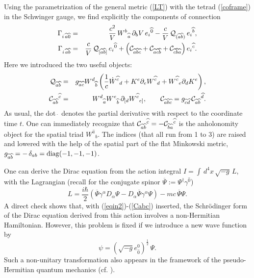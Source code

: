 \documentclass[preprint,showpacs,preprintnumbers,eqsecnum,amsmath,amssymb]{revtex4-1}
\begin{document}
Using the parametrization of the general metric (\ref{LT}) with the tetrad
(\ref{coframe}) in the Schwinger gauge, we find explicitly the components of connection
\begin{eqnarray}
\Gamma_{i\,\widehat{a}\widehat{0}} &=& {\frac {c^2}V}\,W^b{}_{\widehat{a}}
\,\partial_bV\,e_i{}^{\widehat{0}} - {\frac cV}\,{\cal Q}_{(\widehat{a}
\widehat{b})}\,e_i{}^{\widehat{b}},\label{connection1}\\
\Gamma_{i\,\widehat{a}\widehat{b}} &=& {\frac cV}\,{\cal Q}_{[\widehat{a}
\widehat{b}]}\,e_i{}^{\widehat{0}} + \left({\cal C}_{\widehat{a}\widehat{b}
\widehat{c}} + {\cal C}_{\widehat{a}\widehat{c}\widehat{b}} + {\cal C}_{\widehat{c}
\widehat{b}\widehat{a}}\right) e_i{}^{\widehat{c}}.\label{connection2}
\end{eqnarray}
Here we introduced the two useful objects:
\begin{eqnarray}
{\cal Q}_{\widehat{a}\widehat{b}} &=& g_{\widehat{a}\widehat{c}}W^d{}_{\widehat{b}}
\left({\frac 1c}\dot{W}^{\widehat c}{}_d + K^e\partial_e{W}^{\widehat c}{}_d
+ {W}^{\widehat c}{}_e\partial_dK^e\right),\label{Qab}\\
{\cal C}_{\widehat{a}\widehat{b}}{}^{\widehat{c}} &=& W^d{}_{\widehat{a}}
W^e{}_{\widehat{b}}\,\partial_{[d}W^{\widehat{c}}{}_{e]},\qquad {\cal
C}_{\widehat{a} \widehat{b}\widehat{c}} = g_{\widehat{c}\widehat{d}}
\,{\cal C}_{\widehat{a}\widehat{b}}{}^{\widehat{d}}.\label{Cabc}
\end{eqnarray}
As usual, the dot $\dot{\,}$ denotes the partial derivative with respect
to the coordinate time $t$. One can immediately recognize that ${\cal
C}_{\widehat{a}\widehat{b}}{}^{\widehat{c}} =- {\cal C}_{\widehat{b}\widehat{a}}{}^{\widehat{c}}$
is the anholonomity object for the spatial triad ${W}^{\widehat a}{}_b$.
The indices (that all run from 1 to 3) are raised and lowered with
the help of the spatial part of the flat Minkowski metric,
$g_{\widehat{a}\widehat{b}} = -\,\delta_{ab} = {\rm diag}(-1, -1, -1)$.

One can derive the Dirac equation from the action integral
$I = \int\,d^4x\,\sqrt{-g}\,L$, %
with the Lagrangian (recall for the conjugate spinor $\overline{\Psi} := \Psi^\dagger
\gamma^{\widehat{0}}$)
\begin{equation}\label{LD}
L = {\frac {i\hbar}{2}}\left(\overline{\Psi}\gamma^\alpha
D_\alpha\Psi - D_\alpha\overline{\Psi}\gamma^\alpha\Psi\right) -
mc\,\overline{\Psi}\Psi.
\end{equation}
A direct check shows that, with (\ref{eqin2})-(\ref{Cabc}) inserted, the Schr\"odinger
form of the Dirac equation derived from this action involves a non-Hermitian
Hamiltonian. However, this problem is fixed if we introduce a new wave function by
\begin{equation}
\psi = \left(\sqrt{-g}e_{\widehat{0}}^0\right)^{\frac
12}\,\Psi.\label{newpsi}
\end{equation}
Such a non-unitary transformation also appears in the framework of
the pseudo-Hermitian quantum mechanics \cite{GorNezn,GorNeznnew} (cf. \cite{lec}).
\end{document}
